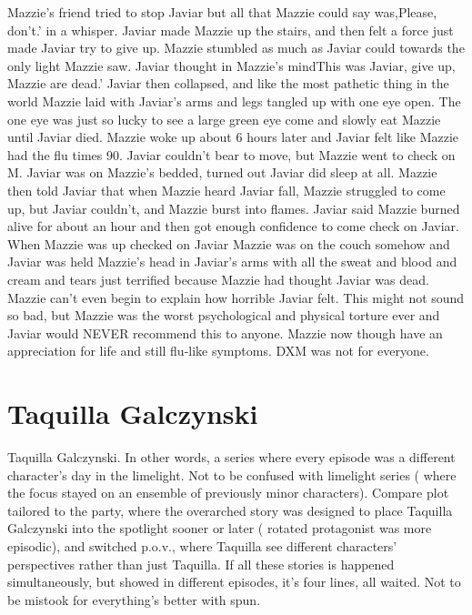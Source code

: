 \documentclass[12pt]{book}
\begin{document}
Mazzie's friend tried to stop Javiar but all that Mazzie could say was,Please, don't.' in a whisper. Javiar made Mazzie up the stairs, and then felt a force just made Javiar try to give up. Mazzie stumbled as much as Javiar could towards the only light Mazzie saw. Javiar thought in Mazzie's mindThis was Javiar, give up, Mazzie are dead.' Javiar then collapsed, and like the most pathetic thing in the world Mazzie laid with Javiar's arms and legs tangled up with one eye open. The one eye was just so lucky to see a large green eye come and slowly eat Mazzie until Javiar died. Mazzie woke up about 6 hours later and Javiar felt like Mazzie had the flu times 90. Javiar couldn't bear to move, but Mazzie went to check on M. Javiar was on Mazzie's bedded, turned out Javiar did sleep at all. Mazzie then told Javiar that when Mazzie heard Javiar fall, Mazzie struggled to come up, but Javiar couldn't, and Mazzie burst into flames. Javiar said Mazzie burned alive for about an hour and then got enough confidence to come check on Javiar. When Mazzie was up checked on Javiar Mazzie was on the couch somehow and Javiar was held Mazzie's head in Javiar's arms with all the sweat and blood and cream and tears just terrified because Mazzie had thought Javiar was dead. Mazzie can't even begin to explain how horrible Javiar felt. This might not sound so bad, but Mazzie was the worst psychological and physical torture ever and Javiar would NEVER recommend this to anyone. Mazzie now though have an appreciation for life and still flu-like symptoms. DXM was not for everyone.



\chapter{Taquilla Galczynski}

Taquilla Galczynski. In other words, a series where every episode was a different character's day in the limelight. Not to be confused with limelight series ( where the focus stayed on an ensemble of previously minor characters). Compare plot tailored to the party, where the overarched story was designed to place Taquilla Galczynski into the spotlight sooner or later ( rotated protagonist was more episodic), and switched p.o.v., where Taquilla see different characters' perspectives rather than just Taquilla. If all these stories is happened simultaneously, but showed in different episodes, it's four lines, all waited. Not to be mistook for everything's better with spun.
\end{document}
